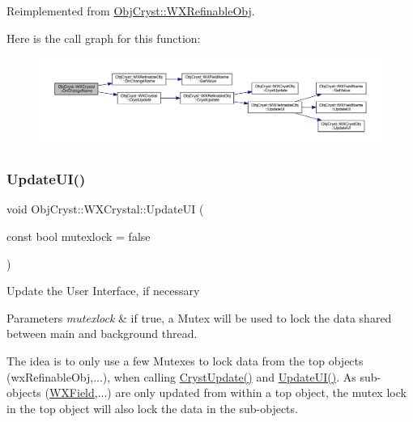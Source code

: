Reimplemented from \mbox{\hyperlink{class_obj_cryst_1_1_w_x_refinable_obj_a1a13aaa3b69044cff0d1c257dea2acb0}{Obj\+Cryst\+::\+W\+X\+Refinable\+Obj}}.

Here is the call graph for this function\+:
\nopagebreak
\begin{figure}[H]
\begin{center}
\leavevmode
\includegraphics[width=350pt]{class_obj_cryst_1_1_w_x_crystal_a7a15c2d1b5f5997ace336724fc396892_cgraph}
\end{center}
\end{figure}
\mbox{\label{class_obj_cryst_1_1_w_x_crystal_a62946717943682dc2ac07ea4584030f4}} 
\subsubsection{\texorpdfstring{UpdateUI()}{UpdateUI()}}
{\footnotesize\ttfamily void Obj\+Cryst\+::\+W\+X\+Crystal\+::\+Update\+UI (\begin{DoxyParamCaption}\item[{const bool}]{mutexlock = {\ttfamily false} }\end{DoxyParamCaption})\hspace{0.3cm}{\ttfamily [virtual]}}

Update the User Interface, if necessary


\begin{DoxyParams}{Parameters}
{\em mutexlock} & if true, a Mutex will be used to lock the data shared between main and background thread.\\
\hline
\end{DoxyParams}
The idea is to only use a few Mutexes to lock data from the top objects (wx\+Refinable\+Obj,...), when calling \mbox{\hyperlink{class_obj_cryst_1_1_w_x_crystal_a4b48719679bb8be44eb77a45ac28f4fb}{Cryst\+Update()}} and \mbox{\hyperlink{class_obj_cryst_1_1_w_x_crystal_a62946717943682dc2ac07ea4584030f4}{Update\+U\+I()}}. As sub-\/objects (\mbox{\hyperlink{class_obj_cryst_1_1_w_x_field}{W\+X\+Field}},...) are only updated from within a top object, the mutex lock in the top object will also lock the data in the sub-\/objects. 


